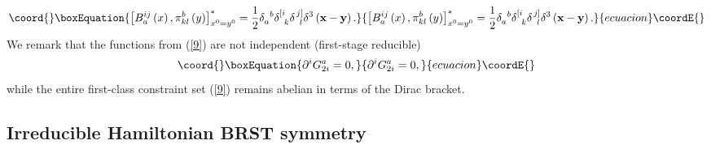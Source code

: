 \documentclass[a4paper,12pt]{article}
\begin{document}
\begin{equation}\coord{}\boxEquation{
\left[ B_{a}^{ij}\left( x\right) ,\pi _{kl}^{b}\left( y\right) \right]
_{x^{0}=y^{0}}^{*}=\frac{1}{2}\delta _{a}^{\;\;b}\delta _{\;\;k}^{\left[
i\right. }\delta _{\;\;l}^{\left. j\right] }\delta ^{3}\left( \mathbf{x}-
\mathbf{y}\right) .  \label{8}
}{
\left[ B_{a}^{ij}\left( x\right) ,\pi _{kl}^{b}\left( y\right) \right]
_{x^{0}=y^{0}}^{*}=\frac{1}{2}\delta _{a}^{\;\;b}\delta _{\;\;k}^{\left[
i\right. }\delta _{\;\;l}^{\left. j\right] }\delta ^{3}\left( \mathbf{x}-
\mathbf{y}\right) .  }{ecuacion}\coordE{}\end{equation}
We remark that the functions \coordHE{} from (\ref{9}) are not independent
(first-stage reducible) 
\begin{equation}\coord{}\boxEquation{
\partial ^{i}G_{2i}^{a}=0,  \label{11}
}{
\partial ^{i}G_{2i}^{a}=0,  }{ecuacion}\coordE{}\end{equation}
while the entire first-class constraint set (\ref{9}) remains abelian in
terms of the Dirac bracket.

\subsection{Irreducible Hamiltonian BRST symmetry}
\end{document}
